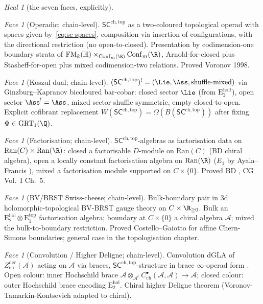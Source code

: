 \documentclass{article}
\theoremstyle{definition}
\theoremstyle{remark}
\newtheorem{heal}[theorem]{Heal}
\newtheorem{face}[theorem]{Face}
\newcommand{\SCchtop}{\mathsf{SC}^{\mathrm{ch,top}}}
\newcommand{\Zder}{Z^{\mathrm{der}}_{\mathrm{ch}}}
\newcommand{\ChirHoch}{C^{\bullet}_{\mathrm{ch}}}
\newcommand{\Ehol}[1]{\mathrm{E}_{#1}^{\mathrm{hol}}}
\newcommand{\Etop}[1]{\mathrm{E}_{#1}^{\mathrm{top}}}
\newcommand{\cA}{\mathcal{A}}
\newcommand{\FM}{\mathrm{FM}}
\newcommand{\Conf}{\mathrm{Conf}}
\newcommand{\Ran}{\mathrm{Ran}}
\begin{document}
\begin{heal}[the seven faces, explicitly]
\hfill

\begin{face}[Operadic; chain-level]\label{face:operadic}
$\SCchtop$ as a two-coloured topological operad with spaces given
by~\eqref{eq:sc-spaces}, composition via insertion of configurations,
with the directional restriction (no open-to-closed). Presentation by
codimension-one boundary strata of
$\FM_k(\mathbb{H})\times_{\Conf_m(\R)}\Conf_m(\R)$, Arnold-for-closed
plus Stasheff-for-open plus mixed codimension-two relations. Proved
Voronov 1998.
\end{face}

\begin{face}[Koszul dual; chain-level]\label{face:koszul}
$(\SCchtop)^{!} = (\Lie, \Ass, \mathrm{shuffle\text{-}mixed})$ via
Ginzburg--Kapranov bicoloured bar-cobar: closed sector $\Lie$ (from
$\Ehol{2}^{!}$), open sector $\Ass^! = \Ass$, mixed sector shuffle
symmetric, empty closed-to-open. Explicit cofibrant replacement
$W(\SCchtop) = \Omega(B(\SCchtop))$ after fixing
$\Phi\in\mathrm{GRT}_1(\Q)$.
\end{face}

\begin{face}[Factorisation; chain-level]\label{face:factorisation}
$\SCchtop$-algebras as factorisation data on
$\Ran(C)\times\Ran(\R)$: closed a factorisable $D$-module on
$\Ran(C)$ (BD chiral algebra), open a locally constant factorisation
algebra on $\Ran(\R)$ ($E_1$ by Ayala--Francis \cite{AF15}), mixed a
factorisation module supported on $C\times\{0\}$. Proved BD
\cite{BD04}, CG \cite{CG} Vol.~I Ch.~5.
\end{face}

\begin{face}[BV/BRST Swiss-cheese; chain-level]\label{face:bv}
Bulk-boundary pair in 3d holomorphic-topological BV-BRST gauge theory
on $C\times\R_{\geq 0}$. Bulk an $\Ehol{2}\otimes\Etop{1}$
factorisation algebra; boundary at $C\times\{0\}$ a chiral algebra
$\cA$; mixed the bulk-to-boundary restriction. Proved
Costello--Gaiotto \cite{CostelloGaiotto} for affine Chern-Simons
boundaries; general case in the topologisation chapter.
\end{face}

\begin{face}[Convolution / Higher Deligne;
chain-level]\label{face:convolution}
Convolution dGLA of $\Zder(\cA)$ acting on $\cA$ via braces,
$\SCchtop$-structure in brace $\infty$-operad form
\cite{Kontsevich-operads-motives}. Open colour: inner Hochschild
brace $\cA\otimes_{\cA^e}\ChirHoch(\cA,\cA)\to\cA$; closed colour:
outer Hochschild brace encoding $\Ehol{2}$. Chiral higher Deligne
theorem (Voronov-Tamarkin-Kontsevich adapted to chiral).
\end{face}


\end{heal}
\end{document}
